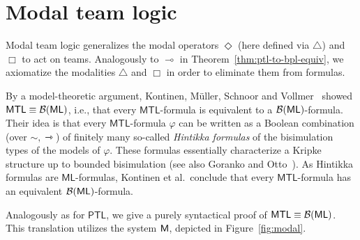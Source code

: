 \documentclass[a4paper,english,fleqn,11pt,final]{scrartcl}
\makeatletter
\newcommand{\ie}{i.e.\@\xspace}
\newcommand{\negg}{{\sim}}
\newcommand{\logic}[1]{\ensuremath{\mathsf{#1}}\xspace}
\newcommand{\ML}{\logic{ML}}
\newcommand{\PTL}{\logic{PTL}}
\newcommand{\MTL}{\logic{MTL}}
\newcommand{\calB}{\protect\ensuremath{\mathcal{B}}}
\newcommand{\sfM}{\protect\ensuremath{\mathsf{M}}}
\newcommand{\limp}{\multimap}
\newcommand{\timp}{\rightarrowtriangle}
\theoremstyle{plain}
\theoremstyle{definition}
\makeatother
\begin{document}
\section{Modal team logic}

\label{sec:modal}

Modal team logic generalizes the modal operators $\Diamond$ (here defined via $\triangle$) and $\Box$ to act on teams.
Analogously to $\limp$ in Theorem~\ref{thm:ptl-to-bpl-equiv}, we axiomatize the modalities $\triangle$ and $\Box$ in order to eliminate them from formulas.




By a model-theoretic argument, Kontinen, Müller, Schnoor and Vollmer~\cite{kontinen_van_2014} showed $\MTL \equiv \calB(\ML)$, \ie, that every $\MTL$-formula is equivalent to a $\calB(\ML)$-formula.
Their idea is that every $\MTL$-formula $\varphi$ can be written as a Boolean combination (over $\negg,\timp$) of finitely many so-called \emph{Hintikka formulas} of the bisimulation types of the models of $\varphi$.
These formulas essentially characterize a Kripke structure up to bounded bisimulation (see also Goranko and Otto~\cite{Goranko2007249}).
As Hintikka formulas are $\ML$-formulas, Kontinen et al.\ conclude that every $\MTL$-formula has an equivalent $\calB(\ML)$-formula.

Analogously as for $\PTL$, we give a purely syntactical proof of $\MTL \equiv \calB(\ML)$.
This translation utilizes the system $\sfM$, depicted in Figure~\ref{fig:modal}.
\end{document}
